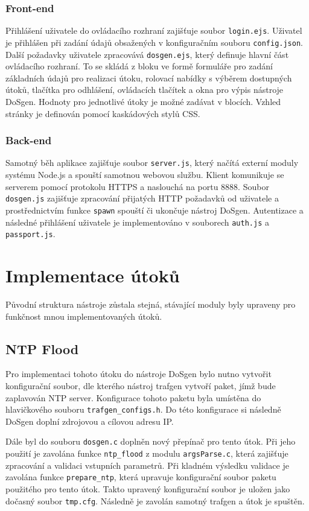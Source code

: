 \subsubsection{Front-end}
Přihlášení uživatele do ovládacího rozhraní zajišťuje soubor \texttt{login.ejs}. Uživatel je přihlášen při zadání údajů obsažených v konfiguračním souboru \texttt{config.json}. Další požadavky uživatele zpracovává \texttt{dosgen.ejs}, který definuje hlavní část ovládacího rozhraní. To se skládá z bloku ve formě formuláře pro zadání základních údajů pro realizaci útoku, rolovací nabídky s výběrem dostupných útoků, tlačítka pro odhlášení, ovládacích tlačítek a okna pro výpis nástroje DoSgen. Hodnoty pro jednotlivé útoky je možné zadávat v blocích. Vzhled stránky je definován pomocí kaskádových stylů CSS.

\subsubsection{Back-end}
Samotný běh aplikace zajišťuje soubor \texttt{server.js}, který načítá externí moduly systému Node.js a spouští samotnou webovou službu. Klient komunikuje se serverem pomocí protokolu HTTPS a naslouchá na portu 8888. Soubor \texttt{dosgen.js} zajišťuje zpracování přijatých HTTP požadavků od uživatele a prostřednictvím funkce \texttt{spawn} spouští či ukončuje nástroj DoSgen. Autentizace a následné přihlášení uživatele je implementováno v souborech \texttt{auth.js} a \texttt{passport.js}.


\section{Implementace útoků}
Původní struktura nástroje zůstala stejná, stávající moduly byly upraveny pro funkčnost mnou implementovaných útoků.

\subsection{NTP Flood}

Pro implementaci tohoto útoku do nástroje DoSgen bylo nutno vytvořit konfigurační soubor, dle kterého nástroj trafgen vytvoří paket, jímž bude zaplavován NTP server. Konfigurace tohoto paketu byla umístěna do hlavičkového souboru \texttt{trafgen\_configs.h}. Do této konfigurace si následně DoSgen doplní zdrojovou a cílovou adresu IP.

Dále byl do souboru \texttt{dosgen.c} doplněn nový přepínač pro tento útok. Při jeho použití je zavolána funkce \texttt{ntp\_flood} z modulu \texttt{argsParse.c}, která zajišťuje zpracování a validaci vstupních parametrů. Při kladném výsledku validace je zavolána funkce \texttt{prepare\_ntp}, která upravuje konfigurační soubor paketu použitého pro tento útok. Takto upravený konfigurační soubor je uložen jako dočasný soubor \texttt{tmp.cfg}. Následně je zavolán samotný trafgen a útok je spuštěn.

